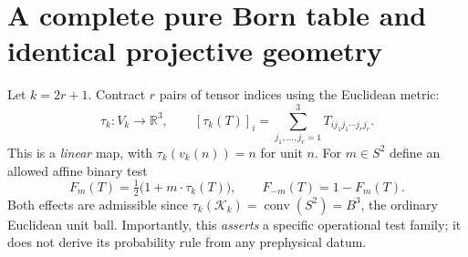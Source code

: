 \documentclass[10.5pt,letterpaper]{article}
\newcommand{\RR}{\mathbb{R}}
\newcommand{\KK}{\mathcal{K}}
\newcommand{\conv}{\operatorname{conv}}
\begin{document}
\section{A complete pure Born table and identical projective geometry}
Let $k=2r+1$. Contract $r$ pairs of tensor indices using the Euclidean metric:
\begin{equation}\label{eq:tau}
\tau_k:V_k\longrightarrow\RR^3,\qquad
[\tau_k(T)]_i=\sum_{j_1,\ldots,j_r=1}^3 T_{i j_1j_1\cdots j_rj_r}.
\end{equation}
This is a \emph{linear} map, with $\tau_k(v_k(n))=n$ for unit $n$. For $m\in S^2$ define an allowed affine binary test
\begin{equation}\label{eq:F}
F_m(T)=\tfrac12\bigl(1+m\cdot\tau_k(T)\bigr),\qquad F_{-m}(T)=1-F_m(T).
\end{equation}
Both effects are admissible since $\tau_k(\KK_k)=\conv(S^2)=B^3$, the ordinary Euclidean unit ball. Importantly, this \emph{asserts} a specific operational test family; it does not derive its probability rule from any prephysical datum.
\end{document}
